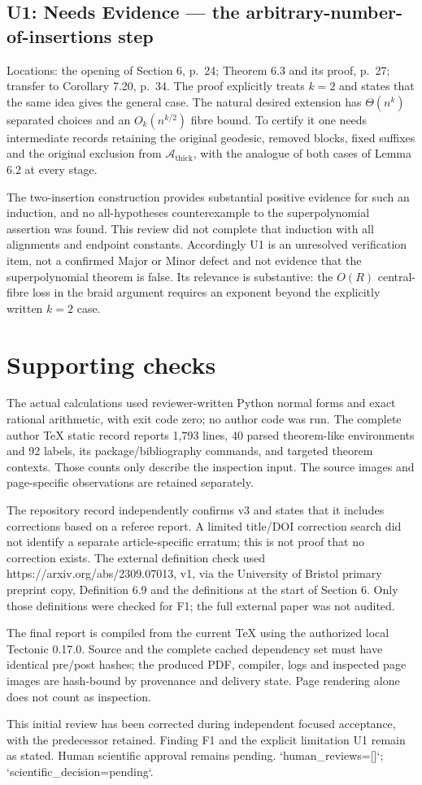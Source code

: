 \documentclass[10pt]{article}
\begin{document}
\subsection*{U1: Needs Evidence — the arbitrary-number-of-insertions step}
Locations: the opening of Section 6, p. 24; Theorem 6.3 and its proof, p. 27; transfer to Corollary 7.20, p. 34. The proof explicitly treats \(k=2\) and states that the same idea gives the general case. The natural desired extension has \(\Theta(n^k)\) separated choices and an \(O_k(n^{k/2})\) fibre bound. To certify it one needs intermediate records retaining the original geodesic, removed blocks, fixed suffixes and the original exclusion from \(\mathcal A_{\mathrm{thick}}\), with the analogue of both cases of Lemma 6.2 at every stage.\par
The two-insertion construction provides substantial positive evidence for such an induction, and no all-hypotheses counterexample to the superpolynomial assertion was found. This review did not complete that induction with all alignments and endpoint constants. Accordingly U1 is an unresolved verification item, not a confirmed Major or Minor defect and not evidence that the superpolynomial theorem is false. Its relevance is substantive: the \(O(R)\) central-fibre loss in the braid argument requires an exponent beyond the explicitly written \(k=2\) case.\par
\section*{Supporting checks}
The actual calculations used reviewer-written Python normal forms and exact rational arithmetic, with exit code zero; no author code was run. The complete author TeX static record reports 1,793 lines, 40 parsed theorem-like environments and 92 labels, its package/bibliography commands, and targeted theorem contexts. Those counts only describe the inspection input. The source images and page-specific observations are retained separately.\par
The repository record independently confirms v3 and states that it includes corrections based on a referee report. A limited title/DOI correction search did not identify a separate article-specific erratum; this is not proof that no correction exists. The external definition check used https://arxiv.org/abs/2309.07013, v1, via the University of Bristol primary preprint copy, Definition 6.9 and the definitions at the start of Section 6. Only those definitions were checked for F1; the full external paper was not audited.\par
The final report is compiled from the current TeX using the authorized local Tectonic 0.17.0. Source and the complete cached dependency set must have identical pre/post hashes; the produced PDF, compiler, logs and inspected page images are hash-bound by provenance and delivery state. Page rendering alone does not count as inspection.\par
This initial review has been corrected during independent focused acceptance, with the predecessor retained. Finding F1 and the explicit limitation U1 remain as stated. Human scientific approval remains pending. `human\_reviews=[]`; `scientific\_decision=pending`.\par
\end{document}
